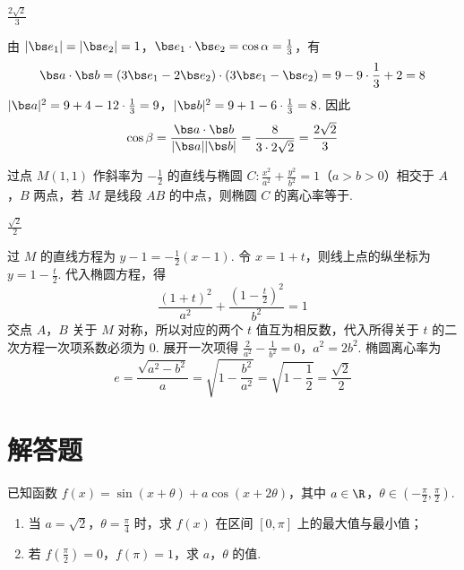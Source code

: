 \begin{answer}
\(\frac{2\sqrt{2}}{3}\)
\end{answer}

\begin{solution}
由 \(|\bs e_1|=|\bs e_2|=1\)，\(\bs e_1\cdot\bs e_2=\cos\alpha=\frac13\)，有
\[
\bs a\cdot\bs b=(3\bs e_1-2\bs e_2)\cdot(3\bs e_1-\bs e_2)=9-9\cdot\frac13+2=8
\]
\(|\bs a|^2=9+4-12\cdot\frac13=9\)，\(|\bs b|^2=9+1-6\cdot\frac13=8\).
因此
\[
\cos\beta=\frac{\bs a\cdot\bs b}{|\bs a||\bs b|}=\frac{8}{3\cdot2\sqrt2}=\frac{2\sqrt2}{3}
\]
\end{solution}

\begin{problem}
过点 \(M(1,1)\) 作斜率为 \(-\frac{1}{2}\) 的直线与椭圆 \(C: \frac{x^2}{a^2} + \frac{y^2}{b^2} = 1\)（\(a > b > 0\)）相交于 \(A\)，\(B\) 两点，若 \(M\) 是线段 \(AB\) 的中点，则椭圆 \(C\) 的离心率等于\fillinblank{}.
\end{problem}

\begin{answer}
\(\frac{\sqrt{2}}{2}\)
\end{answer}

\begin{solution}
过 \(M\) 的直线方程为 \(y-1=-\frac12(x-1)\). 令 \(x=1+t\)，则线上点的纵坐标为 \(y=1-\frac t2\). 代入椭圆方程，得
\[
\frac{(1+t)^2}{a^2}+\frac{(1-\frac t2)^2}{b^2}=1
\]
交点 \(A\)，\(B\) 关于 \(M\) 对称，所以对应的两个 \(t\) 值互为相反数，代入所得关于 \(t\) 的二次方程一次项系数必须为 \(0\). 展开一次项得
\(\frac{2}{a^2}-\frac{1}{b^2}=0\)，\(a^2=2b^2\).
椭圆离心率为
\[
e=\frac{\sqrt{a^2-b^2}}{a}=\sqrt{1-\frac{b^2}{a^2}}=\sqrt{1-\frac12}=\frac{\sqrt2}{2}
\]
\end{solution}

\section{解答题}

\begin{problem}
已知函数 \( f(x) = \sin (x + \theta) + a \cos (x + 2\theta) \)，其中 \(a \in \R\)，\(\theta \in \left(-\frac{\pi}{2}, \frac{\pi}{2}\right)\).

\begin{enumerate}
\item 当 \(a = \sqrt{2}\)，\(\theta = \frac{\pi}{4}\) 时，求 \( f(x) \) 在区间 \([0, \pi]\) 上的最大值与最小值；
\item 若 \(f\left(\frac{\pi}{2}\right) = 0\)，\(f(\pi) = 1\)，求 \(a\)，\(\theta\) 的值.
\end{enumerate}
\end{problem}

